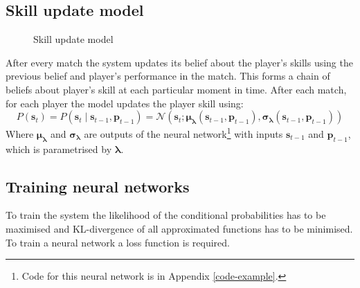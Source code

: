 \documentclass[12pt,a4paper]{book}
\newcommand\bs[1]{\boldsymbol{#1}}
\begin{document}
\subsection{Skill update model}
\begin{figure}[ht]
\centering
{}
\caption{Skill update model}
\label{fig:skill-update}
\end{figure}
After every match the system updates its belief about the player's skills using the previous belief and player's performance in the match.
This forms a chain of beliefs about player's skill at each particular moment in time.
After each match, for each player the model updates the player skill using:
\begin{equation*}
P(\bs{s}_t) = P(\bs{s}_t\mid \bs{s}_{t-1},\bs{p}_{t-1}) = \mathcal{N}(\bs{s}_t;\bs{\mu_\lambda}(\bs{s}_{t-1},\bs{p}_{t-1}),\bs{\sigma_\lambda}(\bs{s}_{t-1},\bs{p}_{t-1}))
\end{equation*}
Where $\bs{\mu_\lambda}$ and $\bs{\sigma_\lambda}$ are outputs of the neural network\footnote{Code for this neural network is in Appendix \ref{code-example}.} with inputs $\bs{s}_{t-1}$ and $\bs{p}_{t-1}$, which is parametrised by $\bs{\lambda}$.

\subsection{Training neural networks}
To train the system the likelihood of the conditional probabilities has to be maximised and KL-divergence of all approximated functions has to be minimised.
To train a neural network a loss function is required.
\end{document}

